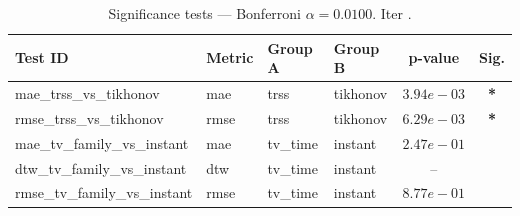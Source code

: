 ﻿%
\begin{table}[ht]
\centering
\caption[EEG reconstruction - Iteration it35]{Significance tests — Bonferroni $\alpha=0.0100$. Iter .}
\label{tab:sig_it35_all4_kalofolias}
\small
\begin{tabular}{llllcc}
\toprule
Test ID & Metric & Group A & Group B & p-value & Sig. \\
\midrule
mae\_trss\_vs\_tikhonov & mae & trss & tikhonov & $3.94e-03$ & \textbf{*} \\
rmse\_trss\_vs\_tikhonov & rmse & trss & tikhonov & $6.29e-03$ & \textbf{*} \\
mae\_tv\_family\_vs\_instant & mae & tv\_time & instant & $2.47e-01$ &  \\
dtw\_tv\_family\_vs\_instant & dtw & tv\_time & instant & -- &  \\
rmse\_tv\_family\_vs\_instant & rmse & tv\_time & instant & $8.77e-01$ &  \\
\bottomrule
\end{tabular}
\end{table}







